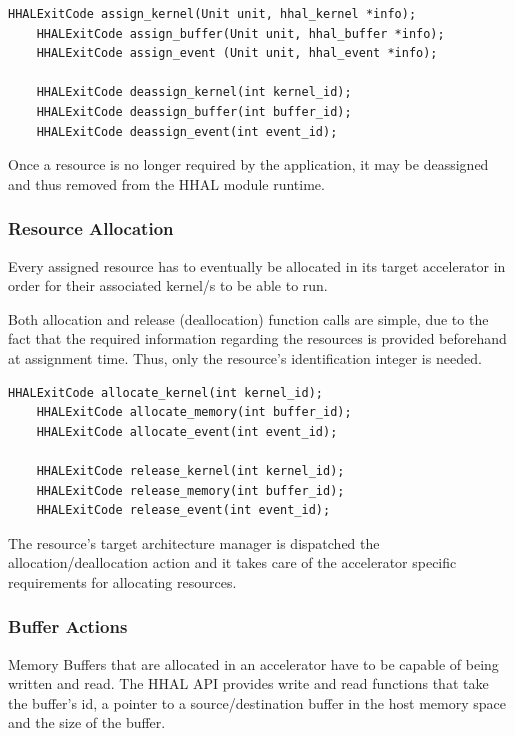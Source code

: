 \begin{lstlisting}[style=CStyle, caption=HHAL API - Assign functions]
    HHALExitCode assign_kernel(Unit unit, hhal_kernel *info);
    HHALExitCode assign_buffer(Unit unit, hhal_buffer *info);
    HHALExitCode assign_event (Unit unit, hhal_event *info);

    HHALExitCode deassign_kernel(int kernel_id);
    HHALExitCode deassign_buffer(int buffer_id);
    HHALExitCode deassign_event(int event_id);
\end{lstlisting}

Once a resource is no longer required by the application, it may be deassigned and thus removed from the HHAL module runtime.

\subsubsection{Resource Allocation}

Every assigned resource has to eventually be allocated in its target accelerator in order for their associated kernel/s to be able to run.

Both allocation and release (deallocation) function calls are simple, due to the fact that the required information regarding the resources is provided beforehand at assignment time. Thus, only the resource's identification integer is needed.

\begin{lstlisting}[style=CStyle, caption=HHAL API - Allocation functions]
    HHALExitCode allocate_kernel(int kernel_id);
    HHALExitCode allocate_memory(int buffer_id);
    HHALExitCode allocate_event(int event_id);

    HHALExitCode release_kernel(int kernel_id);
    HHALExitCode release_memory(int buffer_id);
    HHALExitCode release_event(int event_id);
\end{lstlisting}

The resource's target architecture manager is dispatched the allocation/deallocation action and it takes care of the accelerator specific requirements for allocating resources.

\subsubsection{Buffer Actions}

Memory Buffers that are allocated in an accelerator have to be capable of being written and read. The HHAL API provides write and read functions that take the buffer's id, a pointer to a source/destination buffer in the host memory space and the size of the buffer.


